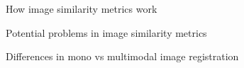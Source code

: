 How image similarity metrics work


Potential problems in image similarity metrics


Differences in mono vs multimodal image registration